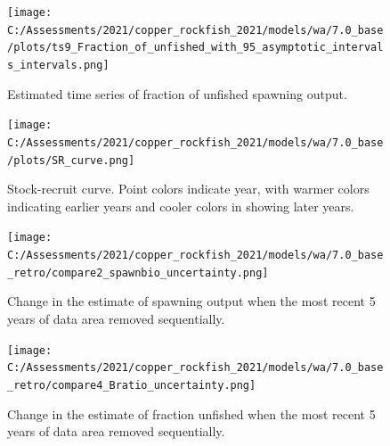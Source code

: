 \documentclass[11pt,
  english,
  a4paper,
]{article}
\begin{document}
\begin{figure}
\centering
\texttt{[image: C:/Assessments/2021/copper\_rockfish\_2021/models/wa/7.0\_base/plots/ts9\_Fraction\_of\_unfished\_with\_95\_asymptotic\_intervals\_intervals.png]}
\caption{Estimated time series of fraction of unfished spawning output.\label{fig:depl}}
\end{figure}

\tagmcend\tagstructend


\begin{figure}
\centering
\texttt{[image: C:/Assessments/2021/copper\_rockfish\_2021/models/wa/7.0\_base/plots/SR\_curve.png]}
\caption{Stock-recruit curve. Point colors indicate year, with warmer colors indicating earlier years and cooler colors in showing later years.\label{fig:bh-curve}}
\end{figure}

\tagmcend\tagstructend


\begin{figure}
\centering
\texttt{[image: C:/Assessments/2021/copper\_rockfish\_2021/models/wa/7.0\_base\_retro/compare2\_spawnbio\_uncertainty.png]}
\caption{Change in the estimate of spawning output when the most recent 5 years of data area removed sequentially.\label{fig:retro-ssb}}
\end{figure}

\tagmcend\tagstructend


\begin{figure}
\centering
\texttt{[image: C:/Assessments/2021/copper\_rockfish\_2021/models/wa/7.0\_base\_retro/compare4\_Bratio\_uncertainty.png]}
\caption{Change in the estimate of fraction unfished when the most recent 5 years of data area removed sequentially.\label{fig:retro-depl}}
\end{figure}

\tagmcend\tagstructend

\end{document}
